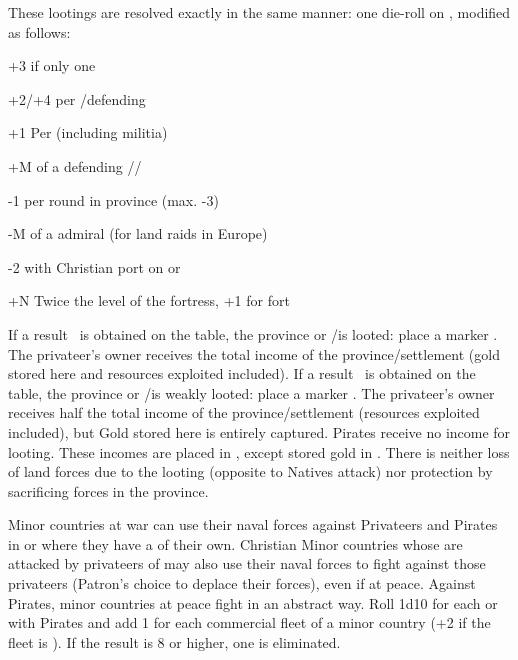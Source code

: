  These lootings are resolved
exactly in the same manner: one die-roll on , modified as follows:
\begin{modlist}
\item[+3] if only one \corsaire\facemoins
\item[+2/+4] per \ARMY\facemoins/\Faceplus defending
\item[+1] Per \LD (including militia) %
\item[+M] \Man of a defending \LeaderG/\LeaderC/\LeaderGov
\item[-1] per round in province (max. -3) %
\item[-M] \Man of a \corsaire admiral (\textonehalf for land raids in Europe)
\item[-2]  with Christian port on  or
\item[+N] Twice the level of the fortress, +1 for fort
\end{modlist}
\bparag If a result \textddag\ is obtained on the table, the province or
\TP/\COL is looted: place a marker \PILLAGE\faceplus. The privateer's owner
receives the total income of the province/settlement (gold stored here and
resources exploited included).
\bparag If a result \textdag\ is obtained on the table, the province or
\TP/\COL is weakly looted: place a marker \PILLAGE\facemoins. The privateer's
owner receives half the total income of the province/settlement (resources
exploited included), but Gold stored here is entirely captured.
\bparag Pirates receive no income for looting.
\bparag These incomes are placed in , except
stored gold in .
\bparag There is neither loss of land forces due to the looting (opposite to
Natives attack) nor protection by sacrificing forces in the province.

\bparag Minor countries at war can use their naval forces against Privateers
and Pirates in \STZ or \CTZ where they have a \TradeFLEET of their own.
\bparag Christian Minor countries whose \TradeFLEET are attacked by privateers
of \Barbaresques may also use their naval forces to fight against those
privateers (Patron's choice to deplace their forces), even if at peace.
\bparag Against Pirates, minor countries at peace fight in an abstract way.
Roll 1d10 for each \STZ or \CTZ with Pirates and add 1 for each commercial
fleet of a minor country (+2 if the fleet is \Faceplus).  If the result is 8
or higher, one \corsaire\facemoins is eliminated.




